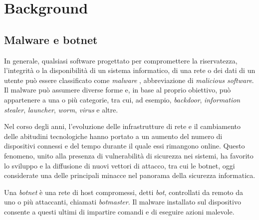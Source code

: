 \chapter{Background} \label{chap:background} %


\section{Malware e botnet} %

In generale, qualsiasi software progettato per compromettere la riservatezza, l'integrità o la disponibilità di un sistema informatico, di una rete o dei dati di un utente può essere classificato come \emph{malware} \cite{sikorski2012malware}, abbreviazione di \emph{malicious software}. Il malware può assumere diverse forme e, in base al proprio obiettivo, può appartenere a una o più categorie, tra cui, ad esempio, \emph{backdoor}, \emph{information stealer}, \emph{launcher}, \emph{worm}, \emph{virus} e altre. %


Nel corso degli anni, l'evoluzione delle infrastrutture di rete e il cambiamento delle abitudini tecnologiche hanno portato a un aumento del numero di dispositivi connessi e del tempo durante il quale essi rimangono online. Questo fenomeno, unito alla presenza di vulnerabilità di sicurezza nei sistemi, ha favorito lo sviluppo e la diffusione di nuovi vettori di attacco, tra cui le botnet, oggi considerate una delle principali minacce nel panorama della sicurezza informatica.


Una \emph{botnet} \cite{silva2013botnets} è una rete di host compromessi, detti \emph{bot}, controllati da remoto da uno o più attaccanti, chiamati \emph{botmaster}. Il malware installato sul dispositivo consente a questi ultimi di impartire comandi e di eseguire azioni malevole. %

